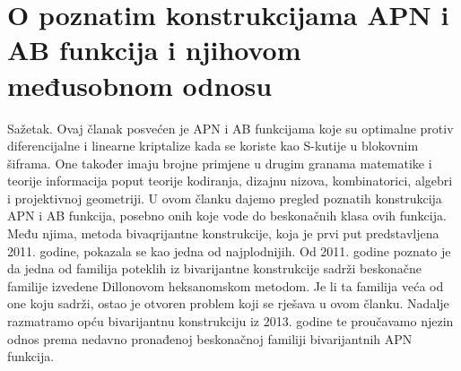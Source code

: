 \documentclass[10pt]{article}
\begin{document}
\section*{O poznatim konstrukcijama APN i AB funkcija i njihovom međusobnom odnosu }
Sažetak. Ovaj članak posvećen je APN i AB funkcijama koje su optimalne protiv diferencijalne i linearne kriptalize kada se koriste kao S-kutije u blokovnim šiframa. One također imaju brojne primjene u drugim granama matematike i teorije informacija poput teorije kodiranja, dizajnu nizova, kombinatorici, algebri i projektivnoj geometriji. U ovom članku dajemo pregled poznatih konstrukcija APN i AB funkcija, posebno onih koje vode do beskonačnih klasa ovih funkcija. Među njima, metoda bivaqrijantne konstrukcije, koja je prvi put predstavljena 2011. godine, pokazala se kao jedna od najplodnijih. Od 2011. godine poznato je da jedna od familija poteklih iz bivarijantne konstrukcije sadrži beskonačne familije izvedene Dillonovom heksanomskom metodom. Je li ta familija veća od one koju sadrži, ostao je otvoren problem koji se rješava u ovom članku. Nadalje razmatramo opću bivarijantnu konstrukciju iz 2013. godine te proučavamo njezin odnos prema nedavno pronađenoj beskonačnoj familiji bivarijantnih APN funkcija.
\end{document}
